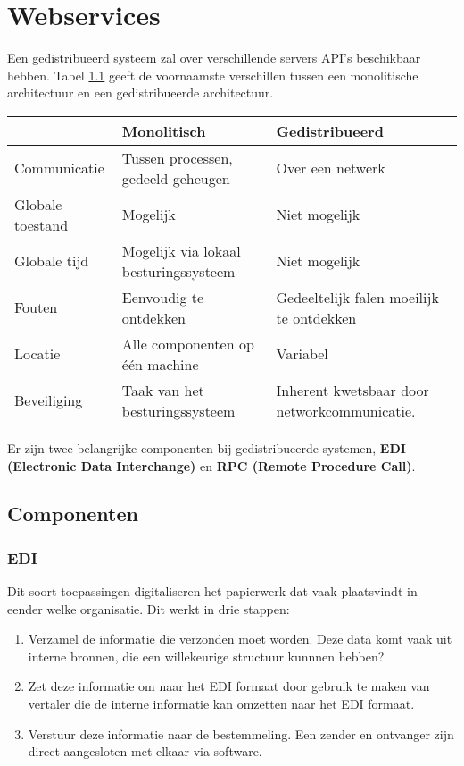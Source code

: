 \documentclass{report}
\begin{document}
\chapter{Webservices}
Een gedistribueerd systeem zal over verschillende servers API's beschikbaar hebben. Tabel \ref{table:mono_vs_distributed} geeft de voornaamste verschillen tussen een monolitische architectuur en een gedistribueerde architectuur.
\begin{table}[h]
	\begin{tabular}{l | l | l}
		& Monolitisch & Gedistribueerd \\
		\hline
		Communicatie & Tussen processen, gedeeld geheugen & Over een netwerk \\
		Globale toestand & Mogelijk & Niet mogelijk \\
		Globale tijd & Mogelijk via lokaal besturingssysteem & Niet mogelijk \\
		Fouten & Eenvoudig te ontdekken & Gedeeltelijk falen moeilijk te ontdekken \\
		Locatie & Alle componenten op één machine & Variabel \\
		Beveiliging & Taak van het besturingssysteem & Inherent kwetsbaar door networkcommunicatie.
	\end{tabular}
	\label{table:mono_vs_distributed}
\end{table}
Er zijn twee belangrijke componenten bij gedistribueerde systemen, \textbf{EDI  (Electronic Data Interchange)} en \textbf{RPC (Remote Procedure Call)}.
 
\section{Componenten}
\subsection{EDI}
Dit soort toepassingen digitaliseren het papierwerk dat vaak plaatsvindt in eender welke organisatie. Dit werkt in drie stappen:
\begin{enumerate}
	\item Verzamel de informatie die verzonden moet worden. Deze data komt vaak uit interne bronnen, die een willekeurige structuur kunnnen hebben?
	\item Zet deze informatie om naar het EDI formaat door gebruik te maken van vertaler die de interne informatie kan omzetten naar het EDI formaat.
	\item Verstuur deze informatie naar de bestemmeling. Een zender en ontvanger zijn direct aangesloten met elkaar via software.
\end{enumerate}
\end{document}

